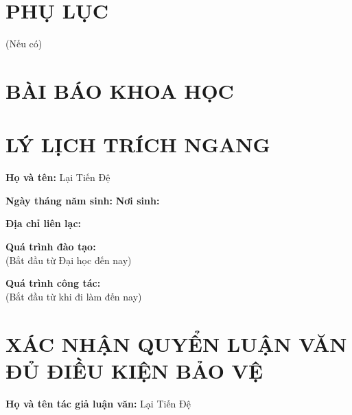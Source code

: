 \documentclass[a4paper,14pt]{extreport}
\begin{document}
\chapter*{PHỤ LỤC}

(Nếu có)


\chapter*{BÀI BÁO KHOA HỌC}



\chapter*{LÝ LỊCH TRÍCH NGANG}

\noindent\textbf{Họ và tên:} Lại Tiến Đệ

\noindent\textbf{Ngày tháng năm sinh:} \dotfill \hspace{2cm} \textbf{Nơi sinh:} \dotfill

\noindent\textbf{Địa chỉ liên lạc:} \dotfill

\noindent\dotfill

\noindent\textbf{Quá trình đào tạo:}\\
(Bắt đầu từ Đại học đến nay)\\
\dotfill

\noindent\textbf{Quá trình công tác:}\\
(Bắt đầu từ khi đi làm đến nay)\\
\dotfill

\chapter*{XÁC NHẬN QUYỂN LUẬN VĂN ĐỦ ĐIỀU KIỆN BẢO VỆ}

\noindent\textbf{Họ và tên tác giả luận văn:} Lại Tiến Đệ
\end{document}
